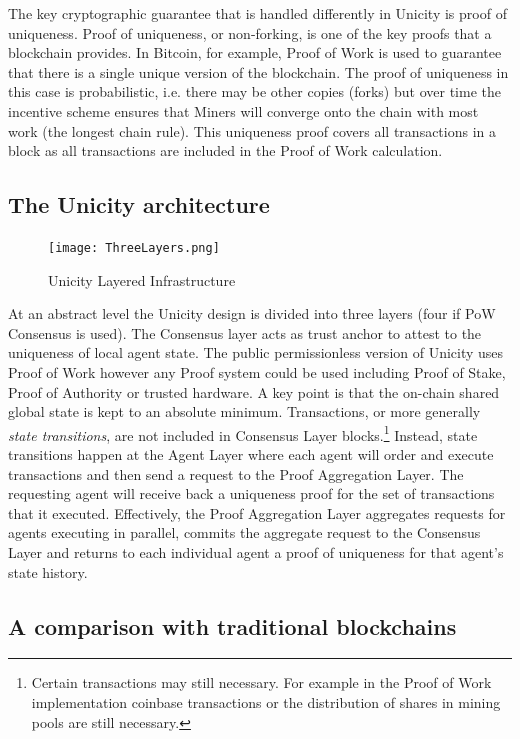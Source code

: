 \documentclass{article}
\begin{document}
The key cryptographic guarantee that is handled differently in Unicity is proof of uniqueness. Proof of uniqueness, or non-forking, is one of the key proofs that a blockchain provides. In Bitcoin, for example, Proof of Work is used to guarantee that there is a single unique version of the blockchain. The proof of uniqueness in this case is probabilistic, i.e. there may be other copies (forks) but over time the incentive scheme ensures that Miners will converge onto the chain with most work (the longest chain rule). This uniqueness proof covers all transactions in a block as all transactions are included in the Proof of Work calculation.

\subsection{The Unicity architecture}

\begin{figure}[htbp]
    \centering
    \texttt{[image: ThreeLayers.png]}
    \caption{Unicity Layered Infrastructure}
    \label{fig:layers}
\end{figure}

At an abstract level the Unicity design is divided into three layers (four if PoW Consensus is used). The Consensus layer acts as trust anchor to attest to the uniqueness of local agent state. The public permissionless version of Unicity uses Proof of Work however any Proof system could be used including Proof of Stake, Proof of Authority or trusted hardware. A key point is that the on-chain shared global state is kept to an absolute minimum. Transactions, or more generally \textit{state transitions}, are not included in Consensus Layer blocks.\footnote{Certain transactions may still necessary. For example in the Proof of Work implementation coinbase transactions or the distribution of shares in mining pools are still necessary.}
	Instead, state transitions happen at the Agent Layer where each agent will order and execute transactions and then send a request to the Proof Aggregation Layer. The requesting agent will receive back a uniqueness proof for the set of transactions that it executed. Effectively, the Proof Aggregation Layer aggregates requests for agents executing in parallel,  commits the aggregate request to the Consensus Layer and returns to each individual agent a proof of uniqueness for that agent's state history.



\subsection{A comparison with traditional blockchains}
\end{document}
